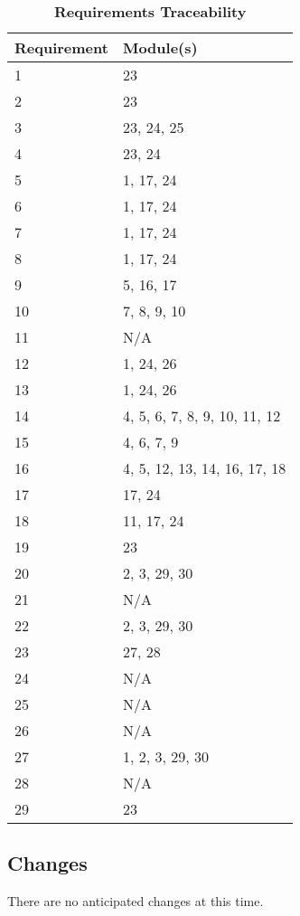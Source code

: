 \documentclass[12pt, titlepage]{article}
\begin{document}
\begin{table}[h]
\caption{\bf Requirements Traceability} \label{tab:reqtrace}
\centering
\begin{tabularx}{0.6\textwidth}{p{4cm}X}
\toprule {\bf Requirement} & {\bf Module(s)}\\
\midrule
1	&	23	\\
2	&	23	\\
3	&	23, 24, 25	\\
4	&	23, 24	\\
5	&	1, 17, 24	\\
6	&	1, 17, 24	\\
7	&	1, 17, 24	\\
8	&	1, 17, 24	\\
9	&	5, 16, 17 \\
10	&	7, 8, 9, 10	\\
11	&	N/A	\\
12	&	1, 24, 26	\\
13	&	1, 24, 26	\\
14	&	4, 5, 6, 7, 8, 9, 10, 11, 12	\\
15	&	4, 6, 7, 9	\\
16	&	4, 5, 12, 13, 14, 16, 17, 18	\\
17	&	17, 24	\\
18	&	11, 17, 24	\\
19	&	23	\\
20	&	2, 3, 29, 30	\\
21	&	N/A	\\
22	&	2, 3, 29, 30	\\
23	&	27, 28	\\
24	&	N/A	\\
25	&	N/A	\\
26	&	N/A	\\
27	&	1, 2, 3, 29, 30	\\
28  &   N/A  \\
29  &    23   \\
\bottomrule
\end{tabularx}
\end{table}

\subsection{Changes}
There are no anticipated changes at this time.
\end{document}
